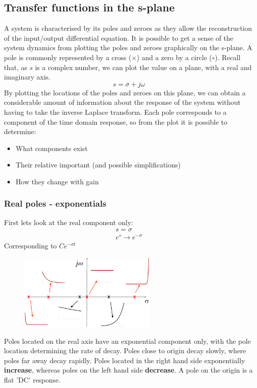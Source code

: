 \documentclass[class=report, crop=false, 12pt,a4paper]{standalone}
\begin{document}
\subsection{Transfer functions in the s-plane}
A system is characterised by its poles and zeroes as they allow the reconstruction of the input/output differential equation. It is possible to get a sense of the system dynamics from plotting the poles and zeroes graphically on the s-plane. A pole is commonly represented by a cross ($\times$) and a zero by a circle ($\circ$). Recall that, as $s$ is a complex number, we can plot the value on a plane, with a real and imaginary axis. 
\begin{equation}
  s = \sigma + j\omega
\end{equation}
By plotting the locations of the poles and zeroes on this plane, we can obtain a considerable amount of information about the response of the system without having to take the inverse Laplace transform. Each pole corresponds to a component of the time domain response, so from the plot it is possible to determine:
\begin{itemize}
  \item What components exist
  \item Their relative important (and possible simplifications)
  \item How they change with gain
\end{itemize}
\subsubsection{Real poles - exponentials}
First lets look at the real component only:
\begin{gather}
  s = \sigma\\
  e^s \rightarrow e^{-\sigma}
\end{gather}
Corresponding to $Ce^{-\sigma t}$
\begin{figure}[H]
  \centering
  \includegraphics[width = 0.6\textwidth]{../img/diagram90.png}
  \caption{}
\end{figure}
Poles located on the real axis have an exponential component only, with the pole location determining the rate of decay. Poles close to origin decay slowly, where poles far away decay rapidly. Poles located in the right hand side exponentially \textbf{increase}, whereas poles on the left hand side \textbf{decrease}. A pole on the origin is a flat 'DC' response.
\end{document}
